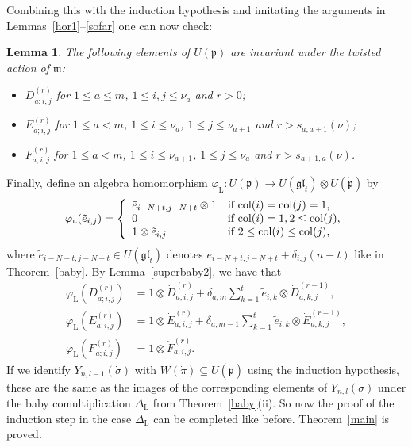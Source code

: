 \documentclass[twoside,12pt,reqno]{amsart}
\newtheorem{Lemma}[Proposition]{Lemma}
\def\col{\operatorname{col}}
\def\lt{{\operatorname{\scriptscriptstyle L}}}
\begin{document}
Combining this with the induction hypothesis and imitating 
the arguments in Lemmas~\ref{hor1}--\ref{sofar} one can now check:

\begin{Lemma}\label{sofar2}
The following elements 
of $U(\mathfrak{p})$ are invariant under the twisted action of
$\mathfrak{m}$:
\begin{itemize}
\item[(i)] $D_{a;i,j}^{(r)}$ 
for  $1 \leq a \leq m$, $1 \leq i,j \leq \nu_a$ and $r > 0$;
\item[(ii)] $E_{a;i,j}^{(r)}$ for 
$1 \leq a < m$, $1 \leq i \leq \nu_a$, $1 \leq j \leq \nu_{a+1}$
and $r > s_{a,a+1}(\nu)$;
\item[(iii)] $F_{a;i,j}^{(r)}$ 
 for 
$1 \leq a< m$, $1 \leq i \leq \nu_{a+1}$, $1 \leq j \leq \nu_{a}$
and $r > s_{a+1,a}(\nu)$.
\end{itemize}
\end{Lemma}

Finally,
define an algebra homomorphism
$\varphi_{\lt}:U(\mathfrak{p}) \rightarrow U(\mathfrak{gl}_t) 
\otimes U(\dot{\mathfrak{p}})$
by 
\begin{equation}\label{philt}
\varphi_{\lt}(\tilde e_{i,j}) = \left\{
\begin{array}{ll}
\tilde e_{i-N+t,j-N+t}\otimes 1&\hbox{if $\col(i)=\col(j)=1$,}\\
0&\hbox{if $\col(i) =1, 2 \leq \col(j)$,}\\
1 \otimes \tilde e_{i,j}&\hbox{if $2 \leq\col(i) \leq \col(j)$,}
\end{array}\right.
\end{equation}
where 
$\tilde e_{i-N+t,j-N+t} \in U(\mathfrak{gl}_t)$
denotes $e_{i-N+t,j-N+t} + \delta_{i,j}(n-t)$ like in Theorem~\ref{baby}.
By Lemma~\ref{superbaby2}, we have that
\begin{align}\label{cindy1}
\varphi_{\lt}(D_{a;i,j}^{(r)}) &= 1 \otimes
\dot D_{a;i,j}^{(r)}
+ \delta_{a,m} \sum_{k=1}^{t} \tilde e_{i,k} \otimes \dot D_{a;k,j}^{(r-1)},\\
\varphi_{\lt}(E_{a;i,j}^{(r)}) &= 1 \otimes \dot E_{a;i,j}^{(r)}
+ \delta_{a,m-1} \sum_{k=1}^{t}\tilde e_{i,k} \otimes \dot E_{a;k,j}^{(r-1)},\\
\varphi_{\lt}(F_{a;i,j}^{(r)}) &= 1 \otimes \dot F_{a;i,j}^{(r)}.
\label{cindy3}
\end{align}
If we identify $Y_{n,l-1}(\dot\sigma)$
with $W(\dot\pi) \subseteq U(\dot{\mathfrak{p}})$ using the induction 
hypothesis,
these are the same as the images of the corresponding
elements of $Y_{n,l}(\sigma)$ under the baby comultiplication
$\Delta_\lt$ from Theorem~\ref{baby}(ii).
So now the proof of the 
induction step in the case $\Delta_{\lt}$ can be completed
like before.
Theorem~\ref{main} is proved.
\end{document}
